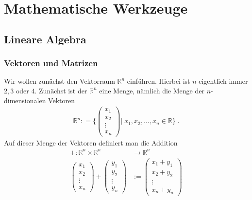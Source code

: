 \section{Mathematische Werkzeuge}

\subsection{Lineare Algebra}
\subsubsection{Vektoren und Matrizen}
Wir wollen zunächst  den Vektorraum $\mathbb{R}^n$ einführen. Hierbei ist $n$ eigentlich immer $2,3$ oder $4$.
Zunächst ist der $\mathbb{R}^n$  eine Menge, nämlich die Menge der $n$-dimensionalen Vektoren 
\begin{align*}
\mathbb{R}^n : = \Biggl \{
\begin{pmatrix}
x_1 \\ x_2 \\ \vdots \\ x_n
\end{pmatrix} \Bigg | \; x_1, x_2, \hdots ,x_n \in \mathbb{R}
 \Biggr \}  \; .
\end{align*}
Auf dieser Menge der Vektoren definiert man die Addition
\begin{align*}
+ : \mathbb{R}^n \times  \mathbb{R}^n   & \to \mathbb{R}^n \\
\begin{pmatrix}
x_1 \\ x_2 \\ \vdots \\ x_n
\end{pmatrix}  +  
\begin{pmatrix}
y_1 \\ y_2 \\ \vdots \\ y_n
\end{pmatrix} 
&  :=  \begin{pmatrix}
x_1 + y_1 \\ x_2  + y_2 \\ \vdots \\ x_n + y_n
\end{pmatrix} 
\end{align*}

